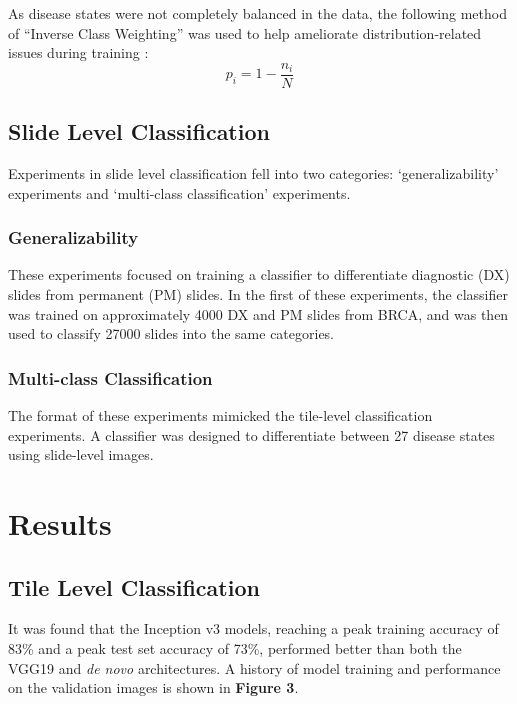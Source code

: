 \documentclass[12pt,]{article}
\begin{document}
As disease states were not completely balanced in the data, the
following method of ``Inverse Class Weighting'' was used to help
ameliorate distribution-related issues during training :
\[p_i = 1 - \frac{n_i}{N}\]

\subsection{Slide Level
Classification}\label{slide-level-classification}

Experiments in slide level classification fell into two categories:
`generalizability' experiments and `multi-class classification'
experiments.

\subsubsection{Generalizability}\label{generalizability}

These experiments focused on training a classifier to differentiate
diagnostic (DX) slides from permanent (PM) slides. In the first of these
experiments, the classifier was trained on approximately 4000 DX and PM
slides from BRCA, and was then used to classify 27000 slides into the
same categories.

\subsubsection{Multi-class
Classification}\label{multi-class-classification}

The format of these experiments mimicked the tile-level classification
experiments. A classifier was designed to differentiate between 27
disease states using slide-level images.

\section{Results}\label{results}

\subsection{Tile Level
Classification}\label{tile-level-classification-1}

It was found that the Inception v3 models, reaching a peak training
accuracy of 83\% and a peak test set accuracy of 73\%, performed better
than both the VGG19 and \emph{de novo} architectures. A history of model
training and performance on the validation images is shown in
\textbf{Figure 3}.
\end{document}
